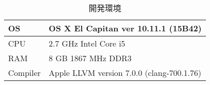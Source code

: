 \begin{table}[h]
	\centering
	\caption{開発環境}
	\label{devEnv}
	\begin{tabular}{|l|l|} \hline
		OS  & OS X El Capitan ver 10.11.1 (15B42) \\ \hline
		CPU & 2.7 GHz Intel Core i5 \\ \hline
		RAM & 8 GB 1867 MHz DDR3 \\ \hline
		Compiler & Apple LLVM version 7.0.0 (clang-700.1.76) \\ \hline
	\end{tabular}
\end{table}
